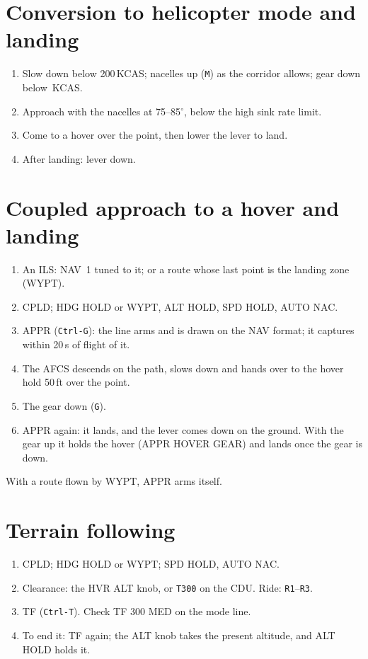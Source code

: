 \documentclass[11pt,a4paper,oneside]{book}
\newcommand{\key}[1]{\texttt{#1}}
\newcommand{\ann}[1]{\textsf{#1}}
\begin{document}
\section{Conversion to helicopter mode and landing}
\begin{enumerate}
\item Slow down below 200\,KCAS; nacelles up (\key{M}) as the corridor allows; gear down below \MVle\,KCAS.
\item Approach with the nacelles at 75--85$^\circ$, below the high sink rate limit.
\item Come to a hover over the point, then lower the lever to land.
\item After landing: lever down.
\end{enumerate}

\section{Coupled approach to a hover and landing}
\begin{enumerate}
\item An ILS: NAV~1 tuned to it; or a route whose last point is the landing zone (WYPT).
\item CPLD; HDG HOLD or WYPT, ALT HOLD, SPD HOLD, AUTO NAC.
\item APPR (\key{Ctrl-G}): the line arms and is drawn on the NAV format; it captures within 20\,s of flight of it.
\item The AFCS descends on the path, slows down and hands over to the hover hold 50\,ft over the point.
\item The gear down (\key{G}).
\item APPR again: it lands, and the lever comes down on the ground. With the gear up it holds the hover
(\ann{APPR HOVER GEAR}) and lands once the gear is down.
\end{enumerate}
With a route flown by WYPT, APPR arms itself.

\section{Terrain following}
\begin{enumerate}
\item CPLD; HDG HOLD or WYPT; SPD HOLD, AUTO NAC.
\item Clearance: the HVR ALT knob, or \key{T300} on the CDU. Ride: \key{R1}--\key{R3}.
\item TF (\key{Ctrl-T}). Check \ann{TF 300 MED} on the mode line.
\item To end it: TF again; the ALT knob takes the present altitude, and ALT HOLD holds it.
\end{enumerate}
\end{document}
